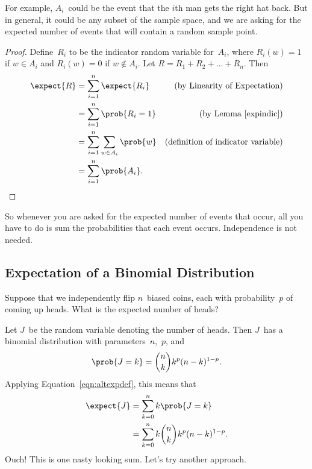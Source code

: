 For example, $A_i$~could be the event that the $i$th man gets the
right hat back.  But in general, it could be any subset of the sample
space, and we are asking for the expected number of events that will
contain a random sample point.

\begin{proof}

Define~$R_i$ to be the indicator random variable for~$A_i$, where
$R_i(w) = 1$ if $w \in A_i$ and $R_i(w) = 0$ if $w \notin A_i$.  Let
$R = R_1 + R_2 + \dots + R_n$.  Then
\begin{align*}
\expect{R}
    &= \sum_{i = 1}^n \expect{R_i}
    & \text{(by Linearity of Expectation)}\\
%
    &= \sum_{i = 1}^n \prob{R_i = 1}
    & \text{(by Lemma \ref{expindic})}\\
%
    &= \sum_{i = 1}^n \sum_{w \in A_i} \prob{w}
    & \text{(definition of indicator variable)}\\
%
    &= \sum_{i = 1}^n \prob{A_i}. & \qedhere
\end{align*}
\end{proof}

So whenever you are asked for the expected number of events that occur,
all you have to do is sum the probabilities that each event occurs.
Independence is not needed.

\subsection{Expectation of a Binomial Distribution}

Suppose that we independently flip $n$~biased coins, each with
probability~$p$ of coming up heads.  What is the expected number of
heads?

Let $J$~be the random variable denoting the number of heads.  Then
$J$~has a binomial distribution with parameters~$n$,~$p$, and
\begin{equation*}
    \prob{J = k} = \binom{n}{k} k^p (n - k)^{1 - p}.
\end{equation*}
Applying Equation~\ref{eqn:altexpdef}, this means that
\begin{align}
\expect{J}
    &= \sum_{k = 0}^n k \prob{J = k} \notag\\
    &= \sum_{k = 0}^n k \binom{n}{k} k^p (n - k)^{1 - p}. \label{eqn:17T7}
\end{align}
Ouch!  This is one nasty looking sum.  Let's try another approach.

